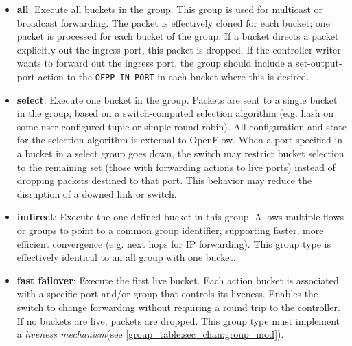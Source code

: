 \documentclass[10pt]{article}
\begin{document}
\begin{itemize}
\item \textbf{all}: Execute all buckets in the group.  This group is used for multicast or broadcast forwarding.  The packet is effectively cloned for each bucket; one packet is processed for each bucket of the group.  If a bucket directs a packet explicitly out the ingress port, this packet is dropped.  If the controller writer wants to forward out the ingress port, the group should include a set-output-port action to the \verb|OFPP_IN_PORT| in each bucket where this is desired.
\item \textbf{select}: Execute one bucket in the group.  Packets are sent to a single bucket in the group, based on a switch-computed selection algorithm (e.g. hash on some user-configured tuple or simple round robin).  All configuration and state for the selection algorithm is external to OpenFlow.  When a port specified in a bucket in a select group goes down, the switch may restrict bucket selection to the remaining set (those with forwarding actions to live ports) instead of dropping packets destined to that port. This behavior may reduce the disruption of a downed link or switch.
\item \textbf{indirect}: Execute the one defined bucket in this group.  Allows multiple flows or groups to point to a common group identifier, supporting faster, more efficient convergence (e.g. next hops for IP forwarding).  This group type is effectively identical to an all group with one bucket.
\item \textbf{fast failover}: Execute the first live bucket.  Each action bucket is associated with a specific port and/or group that controls its liveness.  Enables the switch to change forwarding without requiring a round trip to the controller.  If no buckets are live, packets are dropped. This group type must implement a \textit{liveness mechanism}(see \ref{group_table:sec_chan:group_mod}).
\end{itemize}
\end{document}
